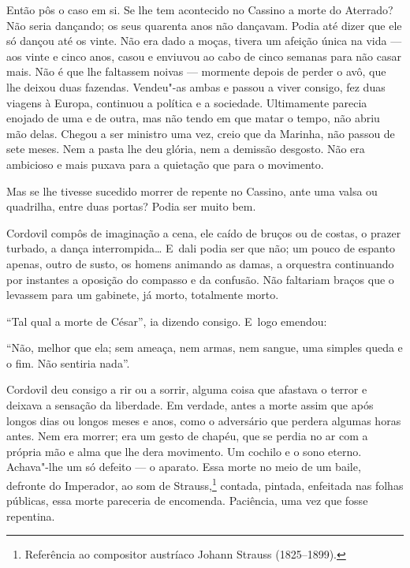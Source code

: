 \begin{linenumbers}
Então pôs o caso em si. Se lhe tem acontecido no Cassino a morte do
Aterrado? Não seria dançando; os seus quarenta anos não dançavam. Podia
até dizer que ele só dançou até os vinte. Não era dado a moças, tivera
um afeição única na vida --- aos vinte e cinco anos, casou e enviuvou ao
cabo de cinco semanas para não casar mais. Não é que lhe faltassem
noivas --- mormente depois de perder o avô, que lhe deixou duas fazendas.
Vendeu"-as ambas e passou a viver consigo, fez duas viagens à Europa,
continuou a política e a sociedade. Ultimamente parecia enojado de uma e
de outra, mas não tendo em que matar o tempo, não abriu mão delas.
Chegou a ser ministro uma vez, creio que da Marinha, não passou de sete
meses. Nem a pasta lhe deu glória, nem a demissão desgosto. Não era
ambicioso e mais puxava para a quietação que para o movimento.

Mas se lhe tivesse sucedido morrer de repente no Cassino, ante uma valsa
ou quadrilha, entre duas portas? Podia ser muito bem.

Cordovil compôs de imaginação a cena, ele caído de bruços ou de costas,
o prazer turbado, a dança interrompida\ldots{} E~dali podia ser que não; um
pouco de espanto apenas, outro de susto, os homens animando as damas, a
orquestra continuando por instantes a oposição do compasso e da
confusão. Não faltariam braços que o levassem para um gabinete, já
morto, totalmente morto.

``Tal qual a morte de César'', ia dizendo consigo. E~logo emendou:

``Não, melhor que ela; sem ameaça, nem armas, nem sangue, uma simples
queda e o fim. Não sentiria nada''.

Cordovil deu consigo a rir ou a sorrir, alguma coisa que afastava o
terror e deixava a sensação da liberdade. Em verdade, antes a morte
assim que após longos dias ou longos meses e anos, como o adversário que
perdera algumas horas antes. Nem era morrer; era um gesto de chapéu, que
se perdia no ar com a própria mão e alma que lhe dera movimento. Um
cochilo e o sono eterno. Achava"-lhe um só defeito --- o aparato. Essa
morte no meio de um baile, defronte do Imperador, ao som de
Strauss,\footnote{Referência ao compositor austríaco Johann Strauss
  (1825--1899).} contada, pintada, enfeitada nas folhas públicas, essa
morte pareceria de encomenda. Paciência, uma vez que fosse repentina.


\end{linenumbers}
